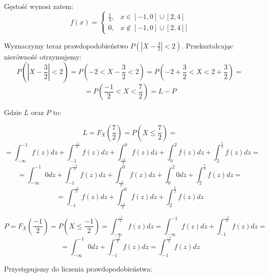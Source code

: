 \documentclass{article}
\begin{document}
Gęstość wynosi zatem:
\begin{equation*}
    f(x) = 
        \begin{cases}
            \frac{1}{3},& x \in [-1, 0] \cup [2, 4]\\
            0,& x \not \in [-1, 0] \cup [2, 4]] 
        \end{cases}
\end{equation*}

Wyznaczymy teraz prawdopodobieństwo \(P(|X - \frac{3}{2}| < 2)\). Przekształcając nierówność otrzymujemy:
\begin{equation*}
    P(|X - \frac{3}{2}| < 2) = P(-2 < X - \frac{3}{2} < 2) = P(-2 + \frac{3}{2} < X < 2 + \frac{3}{2}) =
\end{equation*}
\begin{equation*}
    = P(\frac{-1}{2} < X < \frac{7}{2}) = L - P
\end{equation*}

Gdzie \(L\) oraz \(P\) to: 

\begin{equation*}
    L = F_{X}(\frac{7}{2}) = P(X \leq \frac{7}{2}) =  
\end{equation*}
\begin{equation*}
    = \int_{- \infty}^{-1}f(z)dz + \int_{-1}^{\frac{-1}{2}}f(z)dz + \int_{\frac{-1}{2}}^{0}f(z)dz + \int_{0}^{2}f(z)dz + \int_{2}^{\frac{7}{2}}f(z)dz =
\end{equation*}
\begin{equation*}
    = \int_{- \infty}^{-1}0dz + \int_{-1}^{\frac{-1}{2}}f(z)dz + \int_{\frac{-1}{2}}^{0}f(z)dz + \int_{0}^{2}0dz + \int_{2}^{\frac{7}{2}}f(z)dz =
\end{equation*}
\begin{equation*}
    = \int_{-1}^{\frac{-1}{2}}f(z)dz + \int_{\frac{-1}{2}}^{0}f(z)dz + \int_{2}^{\frac{7}{2}}f(z)dz
\end{equation*}


\begin{equation*}
    P = F_{X}(\frac{-1}{2}) = P(X \leq \frac{-1}{2}) = \int_{- \infty}^{\frac{-1}{2}}f(z)dz = \int_{- \infty}^{-1}f(z)dz + \int_{-1}^{\frac{-1}{2}} f(z)dz =
\end{equation*}
\begin{equation*}
    = \int_{- \infty}^{-1}0dz + \int_{-1}^{\frac{-1}{2}} f(z)dz = \int_{-1}^{\frac{-1}{2}} f(z)dz
\end{equation*}


Przystępujemy do liczenia prawdopodobieństwa:
\end{document}
